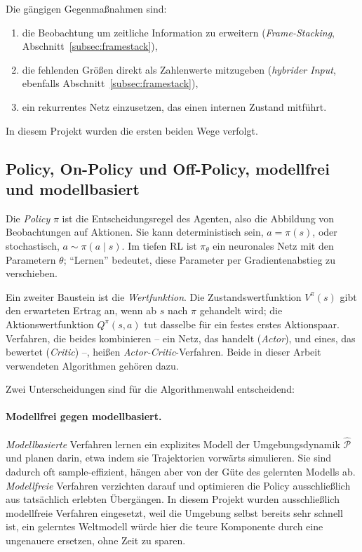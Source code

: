 Die gängigen Gegenmaßnahmen sind:
\begin{enumerate}
  \item die Beobachtung um zeitliche Information zu erweitern (\emph{Frame-Stacking}, Abschnitt~\ref{subsec:framestack}),
  \item die fehlenden Größen direkt als Zahlenwerte mitzugeben (\emph{hybrider Input}, ebenfalls Abschnitt~\ref{subsec:framestack}),
  \item ein rekurrentes Netz einzusetzen, das einen internen Zustand mitführt.
\end{enumerate}
In diesem Projekt wurden die ersten beiden Wege verfolgt.

\subsection{Policy, On-Policy und Off-Policy, modellfrei und modellbasiert}
\label{subsec:policy}

Die \emph{Policy} $\pi$ ist die Entscheidungsregel des Agenten, also die Abbildung von Beobachtungen auf Aktionen. Sie kann deterministisch sein, $a = \pi(s)$, oder stochastisch, $a \sim \pi(a \mid s)$. Im tiefen \ac{RL} ist $\pi_\theta$ ein neuronales Netz mit den Parametern $\theta$; \enquote{Lernen} bedeutet, diese Parameter per Gradientenabstieg zu verschieben.

Ein zweiter Baustein ist die \emph{Wertfunktion}. Die Zustandswertfunktion $V^\pi(s)$ gibt den erwarteten Ertrag an, wenn ab $s$ nach $\pi$ gehandelt wird; die Aktionswertfunktion $Q^\pi(s,a)$ tut dasselbe für ein festes erstes Aktionspaar. Verfahren, die beides kombinieren -- ein Netz, das handelt (\emph{Actor}), und eines, das bewertet (\emph{Critic}) --, heißen \emph{Actor-Critic}-Verfahren. Beide in dieser Arbeit verwendeten Algorithmen gehören dazu.

Zwei Unterscheidungen sind für die Algorithmenwahl entscheidend:

\paragraph{Modellfrei gegen modellbasiert.}
\emph{Modellbasierte} Verfahren lernen ein explizites Modell der Umgebungsdynamik $\hat{\mathcal{P}}$ und planen darin, etwa indem sie Trajektorien vorwärts simulieren. Sie sind dadurch oft sample-effizient, hängen aber von der Güte des gelernten Modells ab. \emph{Modellfreie} Verfahren verzichten darauf und optimieren die Policy ausschließlich aus tatsächlich erlebten Übergängen. In diesem Projekt wurden ausschließlich modellfreie Verfahren eingesetzt, weil die Umgebung selbst bereits sehr schnell ist, ein gelerntes Weltmodell würde hier die teure Komponente durch eine ungenauere ersetzen, ohne Zeit zu sparen.

